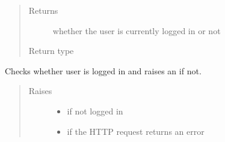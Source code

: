 \documentclass[letterpaper,10pt,english]{sphinxmanual}
\begin{document}
\begin{fulllineitems}
\begin{fulllineitems}
\begin{quote}
\begin{description}
\item[{Returns}] \leavevmode
\sphinxAtStartPar
whether the user is currently logged in or not

\item[{Return type}] \leavevmode
\sphinxAtStartPar
{}

\end{description}\end{quote}

\end{fulllineitems}


\begin{fulllineitems}
\label{\detokenize{autoapi/pine/client/client/index:pine.client.client.PineClient._check_login}}
\sphinxAtStartPar
Checks whether user is logged in and raises an {\hyperref[\detokenize{autoapi/pine/client/exceptions/index:pine.client.exceptions.PineClientAuthException}]{}} if not.
\begin{quote}\begin{description}
\item[{Raises}] \leavevmode\begin{itemize}
\item {} 
\sphinxAtStartPar
{\hyperref[\detokenize{autoapi/pine/client/exceptions/index:pine.client.exceptions.PineClientAuthException}]{}} \textendash{} if not logged in

\item {} 
\sphinxAtStartPar
{\hyperref[\detokenize{autoapi/pine/client/exceptions/index:pine.client.exceptions.PineClientHttpException}]{}} \textendash{} if the HTTP request returns an error

\end{itemize}

\end{description}\end{quote}

\end{fulllineitems}


\end{fulllineitems}
\end{document}
